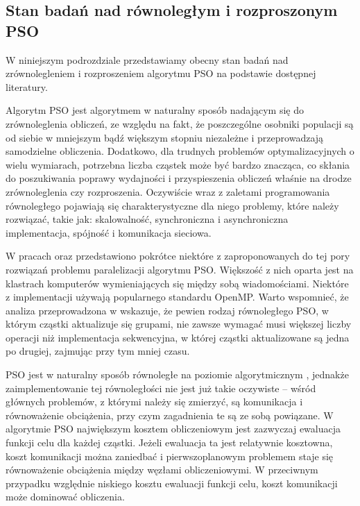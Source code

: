 \documentclass[12pt, twoside, openany, abstract=on]{report}
\theoremstyle{definition}
\begin{document}
\subsection{Stan badań nad równoległym i rozproszonym PSO}


W niniejszym podrozdziale przedstawiamy obecny stan badań nad zrównolegleniem i rozproszeniem algorytmu PSO na podstawie dostępnej literatury.

Algorytm PSO jest algorytmem w naturalny sposób nadającym się do zrównoleglenia obliczeń, ze względu na fakt, że poszczególne osobniki populacji
 są od siebie w mniejszym bądź większym stopniu niezależne i przeprowadzają samodzielne obliczenia. Dodatkowo, dla trudnych problemów optymalizacyjnych o wielu wymiarach, potrzebna liczba cząstek może być bardzo znacząca, co skłania do poszukiwania poprawy wydajności i przyspieszenia obliczeń właśnie na drodze zrównoleglenia czy rozproszenia. 
Oczywiście wraz z zaletami programowania równoległego pojawiają się charakterystyczne dla niego problemy, które należy rozwiązać, takie jak: skalowalność, synchroniczna i asynchroniczna implementacja, spójność i komunikacja sieciowa. 

W pracach \cite{AccelParallelPso} oraz \cite{ComparisonParallelGpuPso} przedstawiono pokrótce niektóre z zaproponowanych do tej pory rozwiązań problemu paralelizacji algorytmu PSO. Większość z nich oparta jest na klastrach komputerów wymieniających się między sobą wiadomościami.
Niektóre z implementacji używają popularnego standardu OpenMP. Warto wspomnieć, że analiza przeprowadzona w \cite{Pso8} wskazuje, że pewien rodzaj równoległego PSO, w którym cząstki aktualizuje się grupami, nie zawsze wymagać musi większej liczby operacji niż implementacja sekwencyjna, w której cząstki aktualizowane są jedna po drugiej, zajmując przy tym mniej czasu.

PSO jest w naturalny sposób równoległe na poziomie algorytmicznym
, jednakże zaimplementowanie tej równoległości nie jest już takie oczywiste – wśród głównych problemów, z którymi należy się zmierzyć, są komunikacja %
 i równoważenie obciążenia, przy czym zagadnienia te są ze sobą powiązane. W algorytmie PSO największym kosztem obliczeniowym jest zazwyczaj ewaluacja funkcji celu dla każdej cząstki. Jeżeli ewaluacja ta jest relatywnie kosztowna, koszt komunikacji można zaniedbać i pierwszoplanowym problemem staje się równoważenie obciążenia między węzłami obliczeniowymi.
W przeciwnym przypadku względnie niskiego kosztu ewaluacji funkcji celu, koszt komunikacji może dominować obliczenia.
\end{document}
